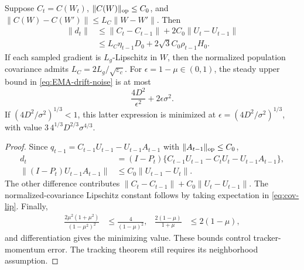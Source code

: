 \begin{corollary}
Suppose $C_t=C(W_t)$, $\|C(W)\|_{\rm op}\le C_0$, and
$\|C(W)-C(W')\|\le L_C\|W-W'\|$. Then
\begin{align}
 \|d_t\|&\le\|C_t-C_{t-1}\|+2C_0\|U_t-U_{t-1}\|\\
 &\le L_C\eta_{t-1}D_0+2\sqrt3C_0\rho_{t-1}H_0.\label{eq:closed-EMA-drift}
\end{align}
If each sampled gradient is $L_g$-Lipschitz in $W$, then the normalized
population covariance admits $L_C=2L_g/\sqrt{\varepsilon_c}$.
For $\epsilon=1-\mu\in(0,1)$, the steady upper bound in
\eqref{eq:EMA-drift-noise} is at most
\begin{equation}
 \frac{4D^2}{\epsilon^2}+2\epsilon\sigma^2.
\end{equation}
If $(4D^2/\sigma^2)^{1/3}<1$, this latter expression is minimized at
$\epsilon=(4D^2/\sigma^2)^{1/3}$, with value
$3\,4^{1/3}D^{2/3}\sigma^{4/3}$.
\end{corollary}
\begin{proof}
Since $q_{t-1}=C_{t-1}U_{t-1}-U_{t-1}A_{t-1}$ with
$\|A_{t-1}\|_{\rm op}\le C_0$,
\begin{align}
 d_t&=(I-P_t)\{C_{t-1}U_{t-1}-C_tU_t-U_{t-1}A_{t-1}\},\\
 \|(I-P_t)U_{t-1}A_{t-1}\|
 &\le C_0\|U_{t-1}-U_t\|.
\end{align}
The other difference contributes
$\|C_t-C_{t-1}\|+C_0\|U_t-U_{t-1}\|$.
The normalized-covariance Lipschitz constant follows by taking expectation
in \eqref{eq:cov-lip}. Finally,
\begin{align}
 \frac{2\mu^2(1+\mu^2)}{(1-\mu^2)^2}&\le\frac4{(1-\mu)^2},&
 \frac{2(1-\mu)}{1+\mu}&\le2(1-\mu),
\end{align}
and differentiation gives the minimizing value. These bounds control
tracker-momentum error. The tracking theorem still requires its
neighborhood assumption.
\end{proof}
